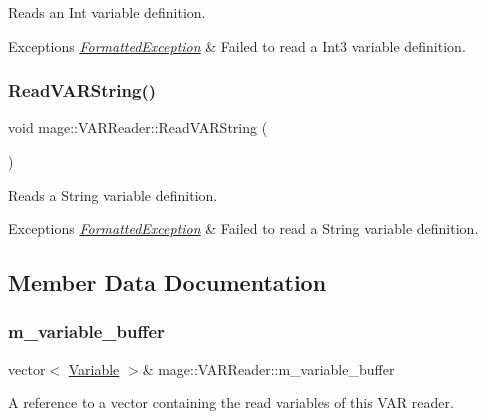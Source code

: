 Reads an Int variable definition.


\begin{DoxyExceptions}{Exceptions}
{\em \hyperlink{classmage_1_1_formatted_exception}{Formatted\+Exception}} & Failed to read a Int3 variable definition. \\
\hline
\end{DoxyExceptions}
\hypertarget{classmage_1_1_v_a_r_reader_a52bb3a842c7887099a4dff875a3608a0}{}\label{classmage_1_1_v_a_r_reader_a52bb3a842c7887099a4dff875a3608a0} 
\subsubsection{\texorpdfstring{Read\+V\+A\+R\+String()}{ReadVARString()}}
{\footnotesize\ttfamily void mage\+::\+V\+A\+R\+Reader\+::\+Read\+V\+A\+R\+String (\begin{DoxyParamCaption}{ }\end{DoxyParamCaption})\hspace{0.3cm}{\ttfamily [private]}}

Reads a String variable definition.


\begin{DoxyExceptions}{Exceptions}
{\em \hyperlink{classmage_1_1_formatted_exception}{Formatted\+Exception}} & Failed to read a String variable definition. \\
\hline
\end{DoxyExceptions}


\subsection{Member Data Documentation}
\hypertarget{classmage_1_1_v_a_r_reader_ad532fcdb98d95524c4e62564058485d3}{}\label{classmage_1_1_v_a_r_reader_ad532fcdb98d95524c4e62564058485d3} 
\subsubsection{\texorpdfstring{m\+\_\+variable\+\_\+buffer}{m\_variable\_buffer}}
{\footnotesize\ttfamily vector$<$ \hyperlink{structmage_1_1_variable}{Variable} $>$\& mage\+::\+V\+A\+R\+Reader\+::m\+\_\+variable\+\_\+buffer\hspace{0.3cm}{\ttfamily [private]}}

A reference to a vector containing the read variables of this V\+AR reader. 